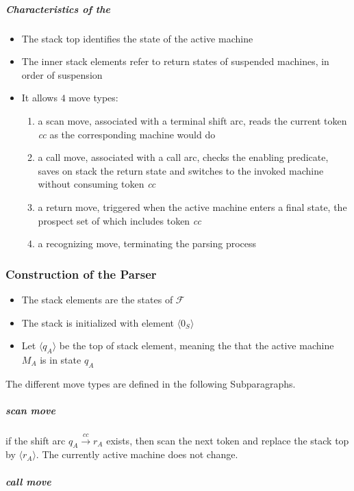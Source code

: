 \documentclass[english]{article}
\begin{document}
\subparagraph*{Characteristics of the \DPDA}
\begin{itemize}
  \item The stack top identifies the state of the active machine
  \item The inner stack elements refer to return states of suspended machines, in order of suspension
  \item It allows \(4\) move types:
        \begin{enumerate}
          \item a scan move, associated with a terminal shift arc, reads the current token \textit{cc} as the corresponding machine would do
          \item a call move, associated with a call arc, checks the enabling predicate, saves on stack the return state and switches to the invoked machine without consuming token \textit{cc}
          \item a return move, triggered when the active machine enters a final state, the prospect set of which includes token \textit{cc}
          \item a recognizing move, terminating the parsing process
        \end{enumerate}
\end{itemize}

\subsubsection[Construction of the ELL(1) Parser]{Construction of the \ello Parser}

\begin{itemize}
  \item The stack elements are the states of \PCFG \(\mathcal{F}\)
  \item The stack is initialized with element \(\langle 0_S \rangle\)
  \item Let \(\langle q_A \rangle\) be the top of stack element, meaning the that the active machine \(M_A\) is in state \(q_A\)
\end{itemize}

The different move types are defined in the following Subparagraphs.

\subparagraph*{scan move}

if the shift arc \(q_A \xrightarrow{\textit{cc}} r_A\) exists, then scan the next token and replace the stack top by \(\langle r_A\rangle\).
The currently active machine does not change.

\subparagraph*{call move}
\end{document}
